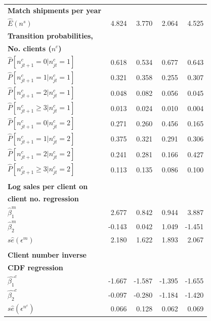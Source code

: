 \documentclass[12pt,titlepage]{article}
\begin{document}
\begin{small}
\begin{longtable}{l|rrrr}
\textbf{Match shipments per year} &  &  &  &  \\ 
$\widehat{E}\left( n^{s}\right) $ & 4.824 & 3.770 & 2.064 & 4.525 \\
\textbf{Transition probabilities, } &  &  &  &  \\ 
\textbf{No. clients (}$n^{c}$\textbf{)} &  &  &  &  \\ 
$\widehat{P}[n_{jt+1}^{c}=0|n_{jt}^{c}=1]$ & 0.618 & 0.534 & 0.677 & 0.643
\\ 
$\widehat{P}[n_{jt+1}^{c}=1|n_{jt}^{c}=1]$ & 0.321 & 0.358 & 0.255 & 0.307
\\ 
$\widehat{P}[n_{jt+1}^{c}=2|n_{jt}^{c}=1]$ & 0.048 & 0.082 & 0.056 & 0.045
\\ 
$\widehat{P}[n_{jt+1}^{c}\geq 3|n_{jt}^{c}=1]$ & 0.013 & 0.024 & 0.010 & 
0.004 \\ 
$\widehat{P}[n_{jt+1}^{c}=0|n_{jt}^{c}=2]$ & 0.271 & 0.260 & 0.456 & 0.165
\\ 
$\widehat{P}[n_{jt+1}^{c}=1|n_{jt}^{c}=2]$ & 0.375 & 0.321 & 0.291 & 0.306
\\ 
$\widehat{P}[n_{jt+1}^{c}=2|n_{jt}^{c}=2]$ & 0.241 & 0.281 & 0.166 & 0.427
\\ 
$\widehat{P}[n_{jt+1}^{c}\geq 3|n_{jt}^{c}=2]$ & 0.113 & 0.135 & 0.086 & 
0.100 \\ 
&  &  &  &  \\ 
\textbf{Log sales per client on} &  &  &  &  \\ 
\textbf{client no. regression} &  &  &  &  \\ 
$\widehat{\beta }_{1}^{m}$ & 2.677 & 0.842 & 0.944 & 3.887 \\ 
$\widehat{\beta }_{2}^{m}$ & -0.143 & 0.042 & 1.049 & -1.451 \\ 
$s\widehat{e}(\epsilon ^{m})$ & 2.180 & 1.622 & 1.893 & 2.067 \\ 
&  &  &  &  \\ 
\textbf{Client number inverse} &  &  &  &  \\ 
\textbf{CDF regression} &  &  &  &  \\ 
$\widehat{\beta _{1}}^{c}$ & -1.667 & -1.587 & -1.395 & -1.655 \\ 
$\widehat{\beta _{2}}^{c}$ & -0.097 & -0.280 & -1.184 & -1.420 \\ 
$s\widehat{e}(\epsilon ^{n^{c}})$ & 0.066 & 0.128 & 0.062 & 0.069 \\ \hline
\end{longtable}
\end{small}
\end{document}
